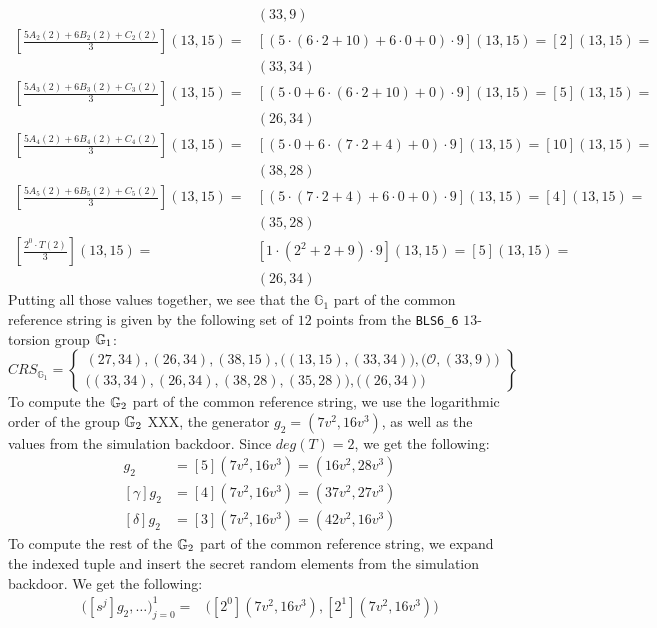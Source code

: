 \begin{example}
\begin{align*}
 & (33,9) \\
[\frac{5 A_{2}(2)+ 6 B_{2}(2) + C_{2}(2)}{3}](13,15) =
 & [(5\cdot (6\cdot 2 +10) +6\cdot 0 +0 )\cdot 9](13,15) = [2](13,15) = \\
 & (33,34) \\
[\frac{5 A_{3}(2)+ 6 B_{3}(2) + C_{3}(2)}{3}](13,15) =
 & [(5\cdot 0 +6\cdot (6\cdot 2 + 10) + 0 )\cdot 9](13,15) = [5](13,15) = \\
 & (26,34) \\
[\frac{5 A_{4}(2)+ 6 B_{4}(2) + C_{4}(2)}{3}](13,15) = 
 & [(5\cdot 0+6\cdot(7\cdot 2 +4)+0)\cdot 9](13,15) =[10](13,15) = \\
 & (38,28) \\
[\frac{5 A_{5}(2)+ 6 B_{5}(2) + C_{5}(2)}{3}](13,15) =
 & [(5\cdot (7\cdot 2 + 4) +6\cdot 0 + 0 )\cdot 9](13,15) = [4](13,15) = \\
 & (35,28)\\
[\frac{2^0\cdot T(2)}{3}](13,15) =
 & [1\cdot (2^2+2+9)\cdot 9](13,15)= [5](13,15) = \\
 & (26,34)
\end{align*}
Putting all those values together, we see that the $\mathbb{G}_1$ part of the common reference string is given by the following set of $12$ points from the \texttt{BLS6\_6} $13$-torsion group $\mathbb{G}_1$: 
$$
CRS_{\mathbb{G}_{1}}=\left\{ \begin{array}{c}
(27,34),(26,34),(38,15),\Big((13,15),(33,34)\Big),
\Big(\mathcal{O}, (33,9)\Big)\\
\Big((33,34),(26,34),(38,28),(35,28)\Big),
\Big((26,34)\Big)
\end{array}\right\}
$$
To compute the $\mathbb{G}_2$ part of the common reference string, we use the logarithmic order of the group $\mathbb{G}_2$ XXX, the generator $g_2=(7v^2,16v^3)$, as well as the values from the simulation backdoor. Since $deg(T)=2$, we get the following:
\begin{align*}
[\beta]g_2 & = [5](7v^2,16v^3) = (16v^2,28v^3) \\
[\gamma]g_2 & = [4](7v^2,16v^3) = (37v^2,27v^3) \\
[\delta]g_2 & = [3](7v^2,16v^3) = (42v^2,16v^3)
\end{align*}
To compute the rest of the $\mathbb{G}_2$ part of the common reference string, we expand the indexed tuple and insert the secret random elements from the simulation backdoor. We get the following:
\begin{align*}
\Big( [s^{j}]g_2,\ldots\Big) _{j=0}^{1} = 
 & \Big( [2^0](7v^2,16v^3), [2^1](7v^2,16v^3)\Big)  \\

\end{align*}
\end{example}
